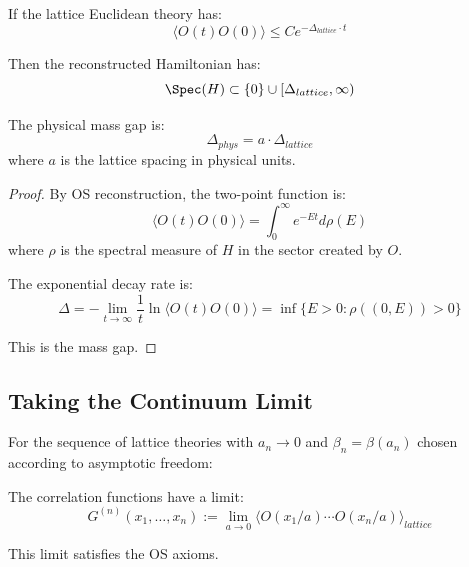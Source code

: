 \begin{theorem}
\label{thm:spectral-implies-mass}
If the lattice Euclidean theory has:
\[
\langle O(t) O(0) \rangle \leq C e^{-\Delta_{lattice} \cdot t}
\]

Then the reconstructed Hamiltonian has:
\[
\Spec(H) \subset \{0\} \cup [\Delta_{lattice}, \infty)
\]

The physical mass gap is:
\[
\Delta_{phys} = a \cdot \Delta_{lattice}
\]
where $a$ is the lattice spacing in physical units.
\end{theorem}

\begin{proof}
By OS reconstruction, the two-point function is:
\[
\langle O(t) O(0) \rangle = \int_0^\infty e^{-Et} d\rho(E)
\]
where $\rho$ is the spectral measure of $H$ in the sector created by $O$.

The exponential decay rate is:
\[
\Delta = -\lim_{t \to \infty} \frac{1}{t} \ln \langle O(t) O(0) \rangle = \inf\{E > 0 : \rho((0,E)) > 0\}
\]

This is the mass gap.
\end{proof}

\subsection{Taking the Continuum Limit}

\begin{theorem}
\label{thm:continuum-existence}
For the sequence of lattice theories with $a_n \to 0$ and $\beta_n = \beta(a_n)$ 
chosen according to asymptotic freedom:

The correlation functions have a limit:
\[
G^{(n)}(x_1, \ldots, x_n) := \lim_{a \to 0} \langle O(x_1/a) \cdots O(x_n/a) \rangle_{lattice}
\]

This limit satisfies the OS axioms.
\end{theorem}

